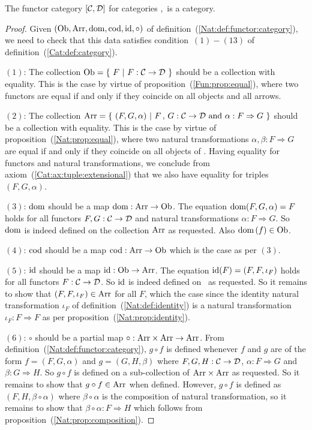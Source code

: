 \begin{prop}\label{Nat:prop:functor:category}
    The functor category $[\mbox{$\cal C$},\mbox{$\cal D$}]$ for categories \Cat,\Dat\ is a 
    category.
\end{prop}
\begin{proof}
    Given $(\mbox{\rm Ob}, \mbox{\rm Arr}, \mbox{\rm dom}, \mbox{\rm cod}, \mbox{\rm id}, \circ)$ of
    definition~(\ref{Nat:def:functor:category}), we need to check that this
    data satisfies condition~$(1)-(13)$ of definition~(\ref{Cat:def:category}).

    $(1)$: The collection $\ob=\{\ F\ |\ F:\Cat\to\Dat\ \}$ should be a
    collection with equality. This is the case by virtue of 
    proposition~(\ref{Fun:prop:equal}), where two functors are equal if 
    and only if they coincide on all objects and all arrows.

    $(2)$: The collection $\arr=\{\ (F,G,\alpha)\ |\ F\,,\,G:\Cat\to\Dat\ 
    \mbox{and}\ \alpha:F\Rightarrow G\ \}$ should be a collection
    with equality. This is the case by virtue of 
    proposition~(\ref{Nat:prop:equal}), where two natural transformations
    $\alpha,\beta:F\Rightarrow G$ are equal if and only if they coincide on
    all objects of \Cat. Having equality for functors and natural
    transformations, we conclude from axiom~(\ref{Cat:ax:tuple:extensional})
    that we also have equality for triples $(F,G,\alpha)$.

    $(3)$: $\mbox{\rm dom}$ should be a map $\mbox{\rm dom}:\mbox{\rm Arr}\to\mbox{\rm Ob}$. The equation
    $\mbox{\rm dom}(F,G,\alpha)=F$ holds for all functors $F,G:\mbox{$\cal C$}\to\mbox{$\cal D$}$ and 
    natural transformations $\alpha:F\Rightarrow G$. So $\mbox{\rm dom}$ is 
    indeed defined on the collection $\mbox{\rm Arr}$ as requested. Also
    $\mbox{\rm dom}\,(f)\in\mbox{\rm Ob}$.

    $(4)$: $\mbox{\rm cod}$ should be a map $\mbox{\rm cod}:\mbox{\rm Arr}\to\mbox{\rm Ob}$ which is the case 
    as per $(3)$.

    $(5)$: $\mbox{\rm id}$ should be a map $\mbox{\rm id}:\mbox{\rm Ob}\to\mbox{\rm Arr}$. The equation $\mbox{\rm id}(F)
    =(F,F,\iota_{F})$ holds for all functors $F:\mbox{$\cal C$}\to\mbox{$\cal D$}$. So $\mbox{\rm id}$
    is indeed defined on \ob\ as requested. So it remains to show that
    $(F,F,\iota_{F})\in\mbox{\rm Arr}$ for all $F$, which the case since
    the identity natural transformation $\iota_{F}$ of
    definition~(\ref{Nat:def:identity}) is a natural transformation 
    $\iota_{F}:F\Rightarrow F$ as per proposition~(\ref{Nat:prop:identity}).

    $(6)$: $\circ$ should be a partial map $\circ:\mbox{\rm Arr}\times\mbox{\rm Arr}\to\mbox{\rm Arr}$.
    From definition~(\ref{Nat:def:functor:category}), $g\circ f$ is defined
    whenever $f$ and $g$ are of the form $f=(F,G,\alpha)$ and $g=(G,H,\beta)$
    where $F,G,H:\mbox{$\cal C$}\to\mbox{$\cal D$}$, $\alpha:F\Rightarrow G$ and $\beta:G\Rightarrow H$. 
    So $g\circ f$ is defined on a sub-collection of $\mbox{\rm Arr}\times\mbox{\rm Arr}$ as requested.     So it remains to show that $g\circ f\in\mbox{\rm Arr}$ when defined. However, 
    $g\circ f$ is defined as $(F,H,\beta\circ\alpha)$ where $\beta\circ\alpha$ 
    is the composition of natural transformation, so it remains to show that 
    $\beta\circ\alpha:F\Rightarrow H$ which follows from
    proposition~(\ref{Nat:prop:composition}).


\end{proof}
